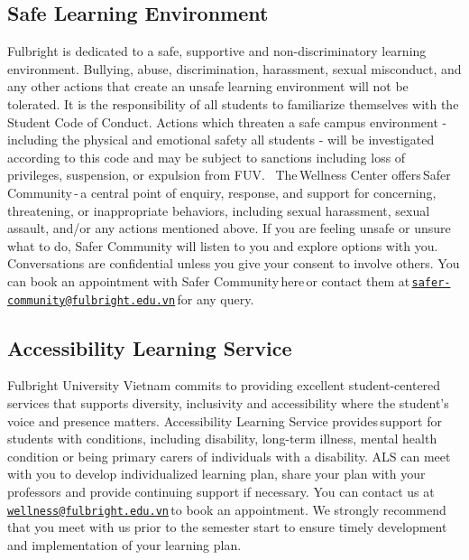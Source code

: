 \documentclass[
]{article}
\begin{document}
\subsection*{Safe Learning Environment\,}\label{safe-learning-environment}

Fulbright is dedicated to a safe, supportive and non-discriminatory learning environment. Bullying, abuse, discrimination, harassment, sexual misconduct, and any other actions that create an unsafe learning environment will not be tolerated. It is the responsibility of all students to familiarize themselves with the\,Student Code of Conduct. Actions which threaten a safe campus environment - including the physical and emotional safety all students - will be investigated according to this code and may be subject to sanctions including loss of privileges, suspension, or expulsion from FUV.
\,
The\,Wellness Center offers\,Safer Community\,-\,a central point of enquiry, response, and support for concerning, threatening, or inappropriate behaviors, including sexual harassment, sexual assault, and/or any actions mentioned above. If you are feeling unsafe or unsure what to do, Safer Community will listen to you and explore options with you. Conversations are confidential unless you give your consent to involve others. You can book an appointment with Safer Community\,here\,or contact them at\,\href{mailto:safer-community@fulbright.edu.vn}{\nolinkurl{safer-community@fulbright.edu.vn}}\,for any query.

\subsection*{Accessibility Learning Service}\label{accessibility-learning-service}

Fulbright University Vietnam commits to providing excellent student-centered services that supports diversity, inclusivity and accessibility where the student's voice and presence matters. Accessibility Learning Service provides\,support for students with conditions, including disability, long-term illness, mental health condition or being primary carers of individuals with a disability. ALS can meet with you to develop individualized learning plan, share your plan with your professors and provide continuing support if necessary. You can contact us at\,\href{mailto:wellness@fulbright.edu.vn}{\nolinkurl{wellness@fulbright.edu.vn}}\,to book an appointment. We strongly recommend that you meet with us prior to the semester start to ensure timely development and implementation of your learning plan.
\end{document}
